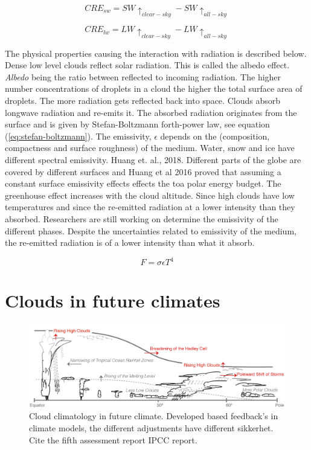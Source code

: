 \begin{equation} \label{eq:cre_sw}
    CRE_{sw} = SW\uparrow_{clear-sky} - SW\uparrow_{all-sky}
\end{equation}

\begin{equation} \label{eq:cre_lw}
    CRE_{lw} = LW\uparrow_{clear-sky} - LW\uparrow_{all-sky}
\end{equation}

The physical properties causing the interaction with radiation is described below. Dense low level clouds reflect solar radiation. This is called the albedo effect. \textit{Albedo} being the ratio between reflected to incoming radiation. The higher number concentrations of droplets in a cloud the higher the total surface area of droplets. The more radiation gets reflected back into space. Clouds absorb longwave radiation and re-emits it. The absorbed radiation originates from the surface and is given by Stefan-Boltzmann forth-power law, see equation (\ref{eq:stefan-boltzmann}). The emissivity, $\epsilon$ depends on the (composition, compactness and surface roughness) of the medium. Water, snow and ice have different spectral emissivity. Huang et. al., 2018. Different parts of the globe are covered by different surfaces and Huang et al 2016 proved that assuming a constant surface emissivity effects effects the \acrshort{toa} polar energy budget. The greenhouse effect increases with the cloud altitude. Since high clouds have low temperatures and since the re-emitted radiation at a lower intensity than they absorbed. Researchers are still working on determine the emissivity of the different phases. Despite the uncertainties related to emissivity of the medium, the re-emitted radiation is of a lower intensity than what it absorb.

\begin{equation} \label{eq:stefan-boltzmann}
    F = \sigma \epsilon T ^4
\end{equation}

\section{Clouds in future climates} \label{sec:intro_cloud_future_climates}
\begin{figure}[h]
    \centering
    \includegraphics[scale = 0.8]{Chapter1_Intro/images/Fig7-11_ipcc.jpg}
    \caption{Cloud climatology in future climate. Developed based feedback's in climate models, the different adjustments have different sikkerhet. Cite the fifth assessment report IPCC report.}
    \label{fig:cloud_scheme}
\end{figure}


